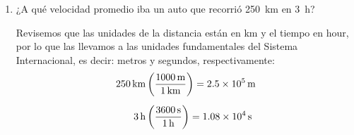 \documentclass[14pt]{extarticle}
\newcommand{\textocolor}[2]{\textbf{\textcolor{#1}{#2}}}
\begin{document}
\begin{enumerate}
Para tener un manejo consistente de unidades, pasamos los \SI{160}{\kilo\meter\per\hour} a \unit{\meter\per\second}
\begin{align*}
\SI[per-mode=fraction]{160}{\kilo\meter\per\hour} \left( \dfrac{\SI{1000}{\meter}}{\SI{1}{\kilo\meter}} \right) \left( \dfrac{\SI{1}{\hour}}{\SI{3600}{\second}} \right) = \SI[per-mode=fraction]{44.44}{\meter\per\second}
\end{align*}

\begin{minipage}[t]{0.4\linewidth}
\textocolor{red}{1. Datos:}
\begin{align*}
v &= \SI[per-mode=fraction]{160}{\kilo\meter\per\hour} = \SI[per-mode=fraction]{44.44}{\meter\per\second} \\
d &= \SI{18.4}{\meter} \\
t &= \, ?
\end{align*}
\end{minipage}
\hspace{1cm}
\begin{minipage}[t]{0.4\linewidth}
\textocolor{red}{2. Expresión:}
\begin{align*}
v = \dfrac{d}{t} \hspace{0.2cm} \Rightarrow \hspace{0.2cm} t = \dfrac{d}{v}
\end{align*}
\end{minipage}

\textocolor{red}{3. Sustitución:}
\begin{align*}
t =  \dfrac{\SI{18.4}{\meter}}{\displaystyle \SI[per-mode=fraction]{44.44}{\meter\per\second}} = \SI{0.414}{\second}
\end{align*}

Revisa que las unidades son segundos, ya que:
\begin{align*}
\dfrac{\unit{\meter}}{\displaystyle \unit[per-mode=fraction]{\meter\per\second}} = \dfrac{\displaystyle \dfrac{\unit{\meter}}{1}}{\displaystyle \unit[per-mode=fraction]{\meter\per\second}} = \dfrac{\unit{\meter\second}}{\unit{\meter}} = \unit{\second}
\end{align*}
\item ¿A qué velocidad promedio iba un auto que recorrió \SI{250}{\kilo\meter} en \SI{3}{\hour}?

Revisemos que las unidades de la distancia están en \unit{\kilo\meter} y el tiempo en \unit{hour}, por lo que las llevamos a las unidades fundamentales del Sistema Internacional, es decir: metros y segundos, respectivamente:
\begin{align*}
\SI{250}{\kilo\meter} &\left( \dfrac{\SI{1000}{\meter}}{\SI{1}{\kilo\meter}} \right) = \SI{2.5d5}{\meter} \\[0.5em]
\SI{3}{\hour} &\left( \dfrac{\SI{3600}{\second}}{\SI{1}{\hour}} \right) = \SI{1.08d4}{\second}
\end{align*}


\end{enumerate}
\end{document}
